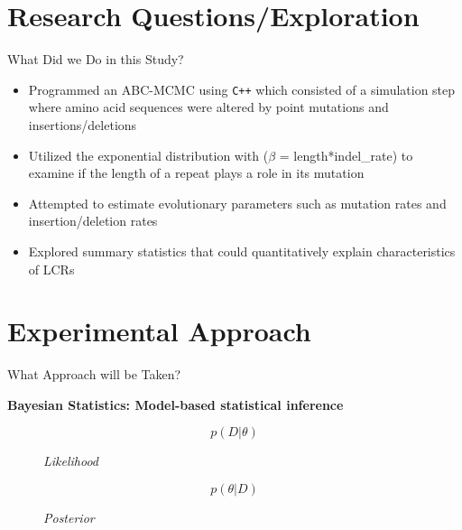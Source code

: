 \documentclass{beamer}
\begin{document}
	\section{Research Questions/Exploration}
	
	\begin{frame}{What Did we Do in this Study?}
		\begin{itemize}
			\item Programmed an ABC-MCMC using \texttt{C++} which consisted of a simulation step where amino acid sequences were altered by point mutations and insertions/deletions \newline
			\item Utilized the exponential distribution with ($\beta$ = length*indel\_rate) to examine if the length of a repeat plays a role in its mutation \newline
			\item Attempted to estimate evolutionary parameters such as mutation rates and insertion/deletion rates \newline
			\item Explored summary statistics that could quantitatively explain characteristics of LCRs
			
		\end{itemize}
		
	\end{frame}

	\section{Experimental Approach}
	\begin{frame}{What Approach will be Taken?}
	
	\textbf{Bayesian Statistics: Model-based statistical inference}
	
	\begin{figure}
		
		\begin{equation} \tag{1}
			p(D|\theta)
		\end{equation}
	\caption{\textit{Likelihood}} \pause
	
		\begin{equation} \tag{2}
			p(\theta|D)
		\end{equation}
	\caption{\textit{Posterior}}
	
	\end{figure}
	
	\end{frame}
\end{document}
